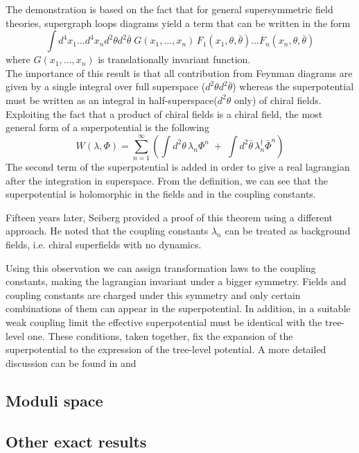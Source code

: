 The demonstration is based on the fact that for general supersymmetric field theories, supergraph loops diagrams yield a term that can be written in the form
\begin{equation}
\int  d^4 x_1 \dots d^4 x_n d^2 \theta d^2 \bar{\theta} \; G (x_1 , \dots , x_n) \,F_1 ( x_1, \theta, \bar{\theta}) \dots  F_n ( x_n, \theta, \bar{\theta}) 
\end{equation} 
where $G (x_1 , \dots , x_n) $ is translationally invariant function.\\
The importance of this result is that all contribution from Feynman diagrams are given by a single integral over full superspace ($d^2 \theta d^2 \bar{\theta} $) whereas the superpotential must be written as an integral in half-superspace($d^2 \theta $ only) of chiral fields.
Exploiting the fact that a product of chiral fields is a chiral field, the most general form of a superpotential is the following
\begin{equation}
 W (\lambda, \Phi) = \sum_{n=1}^{\infty} \left( \int d^2 \theta \, \lambda_n \Phi^n  \; +\;  \int d^2 \bar{\theta} \, \lambda_n^{\dagger} \bar{\Phi}^n \right)
 \end{equation} 
 The second term of the superpotential is added in order to give a real lagrangian after the integration in superspace.
From the definition, we can see that the superpotential is holomorphic in the fields and in the coupling constants.

Fifteen years later, Seiberg \cite{Seiberg:1993vc} provided a proof of this theorem using a different approach.
He noted that the coupling constants $\lambda_n$ can be treated as background fields, i.e. chiral superfields with no dynamics.




Using this observation we can assign transformation laws to the coupling constants, making the lagrangian invariant under a bigger symmetry.
Fields and coupling constants are charged under this symmetry and only certain combinations of them can appear in the superpotential.
In addition, in a suitable weak coupling limit the effective superpotential must be identical with the tree-level one.
These conditions, taken together, fix the expansion of the superpotential to the expression of the tree-level potential.
A more detailed discussion can be found in \cite{Seiberg:1994bp} and \cite{Intriligator:1995au}



\subsection{Moduli space}




\subsection{Other exact results}








